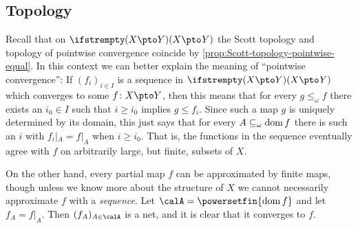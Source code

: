 

\subsection{Topology}\label{sec:pmaps-topology}

Recall that on $\pmaps{X}{Y}$ the Scott topology and topology of pointwise convergence coincide by \cref{prop:Scott-topology-pointwise-equal}. In this context we can better explain the meaning of \enquote{pointwise convergence}: If $(f_i)_{i \in I}$ is a sequence in $\pmaps{X}{Y}$ which converges to some $f \colon X \pto Y$, then this means that for every $g \leq_\omega f$ there exists an $i_0 \in I$ such that $i \geq i_0$ implies $g \leq f_i$. Since such a map $g$ is uniquely determined by its domain, this just says that for every $A \subseteq_\omega \operatorname{dom} f$ there is such an $i$ with $f_i|_A = f|_A$ when $i \geq i_0$. That is, the functions in the sequence eventually agree with $f$ on arbitrarily large, but finite, subsets of $X$.

On the other hand, every partial map $f$ can be approximated by finite maps, though unless we know more about the structure of $X$ we cannot necessarily approximate $f$ with a \emph{sequence}. Let $\calA = \powersetfin{\dom{f}}$ and let $f_A = f|_A$. Then $(f_A)_{A \in \calA}$ is a net, and it is clear that it converges to $f$.

